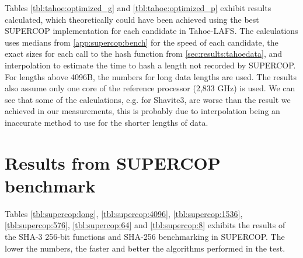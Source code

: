\documentclass[english,12pt,a4paper]{book}
\begin{document}
Tables \ref{tbl:tahoe:optimized_g} and \ref{tbl:tahoe:optimized_p} exhibit
results calculated, which theoretically could have been achieved using the best
\ac{SUPERCOP} implementation for each candidate in Tahoe-\ac{LAFS}. The
calculations uses medians from \autoref{app:supercop:bench} for the speed of
each candidate, the exact sizes for each call to the hash function from
\autoref{sec:results:tahoedata}, and interpolation to estimate the time to hash
a length not recorded by \ac{SUPERCOP}. For lengths above 4096B, the numbers for
long data lengths are used. The results also assume only one core of the
reference processor (2,833 GHz) is used. We can see that some of the
calculations, e.g. for Shavite3, are worse than the result we achieved in our
measurements, this is probably due to interpolation being an inaccurate method
to use for the shorter lengths of data.




\chapter{Results from SUPERCOP benchmark}
\label{app:supercop:bench}

Tables \ref{tbl:supercop:long}, \ref{tbl:supercop:4096},
\ref{tbl:supercop:1536}, \ref{tbl:supercop:576}, \ref{tbl:supercop:64} and
\ref{tbl:supercop:8} exhibits the results of the \ac{SHA}-3 256-bit functions
and \ac{SHA}-256 benchmarking in \ac{SUPERCOP}. The lower the numbers, the
faster and better the algorithms performed in the test.







\end{document}
